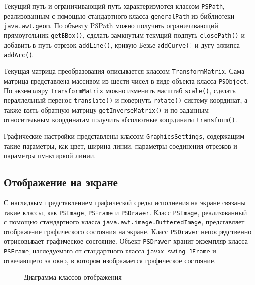 Текущий путь и ограничивающий путь характеризуются классом \texttt{PSPath}, реализованным с помощью стандартного класса \texttt{generalPath} из библиотеки \texttt{java.awt.geom}. По объекту PSPath можно получить ограничивающий прямоугольник \texttt{getBBox()}, сделать замкнутым текущий подпуть \texttt{closePath()} и добавить в путь отрезок \texttt{addLine()}, кривую Безье \texttt{addCurve()} и дугу эллипса \texttt{addArc()}.

Текущая матрица преобразования описывается классом \texttt{TransformMatrix}. Сама матрица представлена массивом из шести чисел в виде объекта класса \texttt{PSObject}. По экземпляру \texttt{TransformMatrix} можно изменить масштаб \texttt{scale()}, сделать пераллельный перенос \texttt{translate()} и повернуть \texttt{rotate()} систему координат, а также взять обратную матрицу \texttt{getInverseMatrix()} и по заданным относительным координатам получить абсолютные координаты \texttt{transform()}.

Графические настройки представлены классом \texttt{GraphicsSettings}, содержащим такие параметры, как цвет, ширина линии, параметры соединения отрезков и параметры пунктирной линии. 

\subsection{Отображение на экране}
\sloppy

С наглядным представлением графической среды исполнения на экране связаны такие классы, как \texttt{PSImage}, \texttt{PSFrame} и \texttt{PSDrawer}.
Класс \texttt{PSImage}, реализованный с помощью стандартного класса \texttt{java.awt.image.BufferedImage}, представляет отображение графического состояния на экране. Класс \texttt{PSDrawer} непосредственно отрисовывает графическое состояние. Объект \texttt{PSDrawer} хранит экземпляр класса \texttt{PSFrame}, наследуемого от стандартного класса \texttt{javax.swing.JFrame} и отвечающего за окно, в котором изображается графическое состояние. 


\begin{figure}[t]
\caption{Диаграмма классов отображения}\label{pic_Frame2}
\end{figure}

